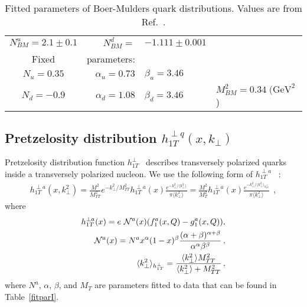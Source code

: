 \documentclass[a4paper,11pt]{article}
\newcommand{\ba}{\begin{eqnarray}}
\newcommand{\ea}{\end{eqnarray}}
\newcommand{\la}{\langle}
\newcommand{\ra}{\rangle}
\def\kperp{k_\perp}
\def\avkperp{\la \kperp^2 \ra}
\begin{document}
 \begin{table}
\centering
\begin{tabular}{crll}
\hline
$N_{BM}^u=2.1\pm0.1$ & $N_{BM}^d=$&$-1.111\pm0.001$   \\
Fixed & parameters: &  \\
$N_u=0.35$ & $\alpha_u=0.73$ & $\beta_u=3.46$ \\
$N_d=-0.9$ & $\alpha_d=1.08$ & $\beta_d=3.46$
& $M_{BM}^2=0.34\; \textrm{(GeV}^2$)    \\
\hline
\end{tabular}
\caption{Fitted parameters of Boer-Mulders quark distributions. Values are from Ref.~\cite{Barone:2009hw}.}
\label{fitparbm}
\end{table}
%
 
\subsection{\boldmath Pretzelosity distribution $h_{1T}^{\perp q}(x,k_\perp)$}
\label{App:basis-h1Tperp}

Pretzelosity   distribution function   
$h_{1T}^{\perp}$~\cite{Lefky:2014eia} describes transversely polarized quarks 
inside a transversely polarized nucleon.
We use the following form of $h_{1T}^{\perp a}$ ~\cite{Lefky:2014eia}:
\ba
h_{1T}^{\perp a}(x,k_{\perp}^2) = \frac{M^2}{M_{TT}^2} e^{-\kperp^2/M_{TT}^2} h^{\perp a}_{1T}(x) \frac{e^{-{\kperp^2}/{\avkperp}}}{\pi \avkperp}=\frac{M^2}{M_T^2} h^{\perp a}_{1T}(x) \frac{e^{-{\kperp^2}/{\avkperp_{h_{1T}^\perp}}}}{\pi \avkperp}\,\;,
\label{eq:h1Tperp}
\ea
where
\ba
h^{\perp a}_{1T}(x) = e  \ {\cal N}^a(x) (f_{1}^{a}(x, Q) - g_{1}^{a}(x, Q)), \label{eq:hx_par}\\
{\cal N}^a(x) = N^{a} x^{\alpha} (1-x)^{\beta} \frac{(\alpha + \beta)^{\alpha + \beta}}{\alpha^{\alpha} \beta^{\beta}}\, ,  \\
\avkperp_{h_{1T}^\perp}  = \frac{\avkperp M_{TT}^2}{\avkperp + M_{TT}^2}\, ,
\ea
where ${N}^a$, $\alpha$, $\beta$, and $M_T$ are parameters fitted to data that can be found in Table~\ref{fitparI}.
\end{document}
